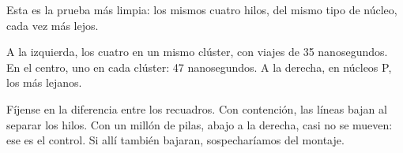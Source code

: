 Esta es la prueba más limpia: los mismos cuatro hilos, del mismo tipo de núcleo, cada vez más lejos.

A la izquierda, los cuatro en un mismo clúster, con viajes de 35 nanosegundos. En el centro, uno en cada clúster: 47 nanosegundos. A la derecha, en núcleos P, los más lejanos.

Fíjense en la diferencia entre los recuadros. Con contención, las líneas bajan al separar los hilos. Con un millón de pilas, abajo a la derecha, casi no se mueven: ese es el control. Si allí también bajaran, sospecharíamos del montaje.
